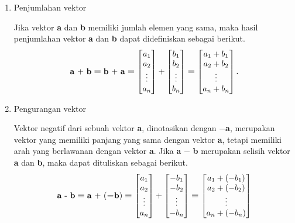 \begin{enumerate}
    \item Penjumlahan vektor
    \par Jika vektor \textbf{a} dan \textbf{b} memiliki jumlah elemen yang sama, maka hasil penjumlahan vektor \textbf{a} dan \textbf{b} dapat didefiniskan sebagai berikut.
    $$
    \text{\textbf{a} + \textbf{b}} \bm{=} \text{\textbf{b} + \textbf{a}} \bm{=}
        \begin{bmatrix}
            a_1 \\a_2 \\\vdots \\a_n
        \end{bmatrix}
        +
        \begin{bmatrix}
            b_1 \\b_2 \\\vdots \\b_n
        \end{bmatrix}
        \bm{=}
        \begin{bmatrix}
            a_1 + b_1 \\a_2 + b_2 \\\vdots \\a_n + b_n
        \end{bmatrix}\text{.}
    $$
    \item Pengurangan vektor
    \par Vektor negatif dari sebuah vektor \textbf{a}, dinotasikan dengan $\bm{-}$\textbf{a}, merupakan vektor yang memiliki panjang yang sama dengan vektor \textbf{a}, tetapi memiliki arah yang berlawanan dengan vektor \textbf{a}. Jika \textbf{a} $\bm{-}$ \textbf{b} merupakan selisih vektor \textbf{a} dan \textbf{b}, maka dapat dituliskan sebagai berikut.
    $$
    \text{\textbf{a} - \textbf{b}} \bm{=} \text{\textbf{a} + ($\bm{-}$\textbf{b})} \bm{=}
        \begin{bmatrix}
            a_1 \\a_2 \\\vdots \\a_n
        \end{bmatrix}
        +
        \begin{bmatrix}
            -b_1 \\-b_2 \\\vdots \\-b_n
        \end{bmatrix}
        \bm{=}
        \begin{bmatrix}
            a_1 + (-b_1) \\a_2 + (-b_2) \\\vdots \\a_n + (-b_n)

\end{bmatrix}$$
\end{enumerate}
